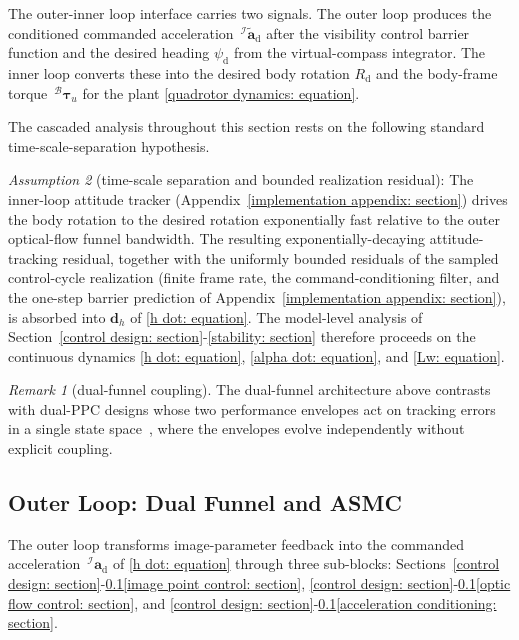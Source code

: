 \documentclass{IEEEtaes}
\begin{document}
The outer-inner loop interface carries two signals. The outer loop produces the conditioned commanded acceleration $\,^\mathcal{I}\tilde{\boldsymbol{a}}_\text{d}$ after the visibility control barrier function and the desired heading $\psi_\text{d}$ from the virtual-compass integrator. The inner loop converts these into the desired body rotation $R_\text{d}$ and the body-frame torque $\,^\mathcal{B}\boldsymbol{\tau}_u$ for the plant \eqref{quadrotor dynamics: equation}.

The cascaded analysis throughout this section rests on the following standard time-scale-separation hypothesis.

\textit{Assumption 2} (time-scale separation and bounded realization residual): The inner-loop attitude tracker (Appendix~\ref{implementation appendix: section}) drives the body rotation to the desired rotation exponentially fast relative to the outer optical-flow funnel bandwidth. The resulting exponentially-decaying attitude-tracking residual, together with the uniformly bounded residuals of the sampled control-cycle realization (finite frame rate, the command-conditioning filter, and the one-step barrier prediction of Appendix~\ref{implementation appendix: section}), is absorbed into $\boldsymbol{d}_h$ of \eqref{h dot: equation}. The model-level analysis of Section~\ref{control design: section}-\ref{stability: section} therefore proceeds on the continuous dynamics \eqref{h dot: equation}, \eqref{alpha dot: equation}, and \eqref{Lw: equation}.

\textit{Remark 1} (dual-funnel coupling). The dual-funnel architecture above contrasts with dual-PPC designs whose two performance envelopes act on tracking errors in a single state space~\cite{lin2022}, where the envelopes evolve independently without explicit coupling.

\subsection{Outer Loop: Dual Funnel and ASMC} \label{outer loop: section}
The outer loop transforms image-parameter feedback into the commanded acceleration $\,^\mathcal{I}\boldsymbol{a}_\text{d}$ of \eqref{h dot: equation} through three sub-blocks: Sections~\ref{control design: section}-\ref{outer loop: section}\ref{image point control: section}, \ref{control design: section}-\ref{outer loop: section}\ref{optic flow control: section}, and \ref{control design: section}-\ref{outer loop: section}\ref{acceleration conditioning: section}.
\end{document}
